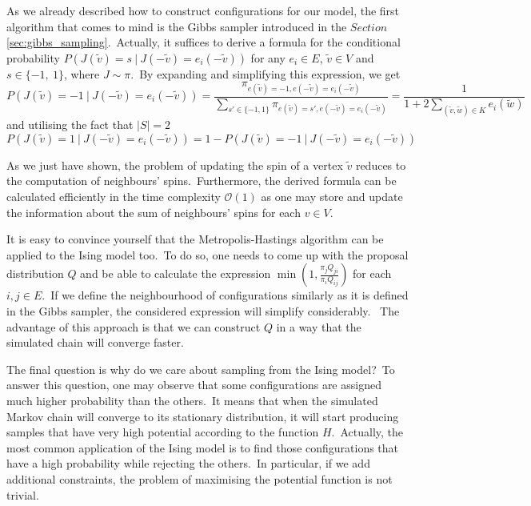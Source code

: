 \documentclass[shortabstract, english, lic]{iithesis}
\theoremstyle{default_theorem_style}\newtheorem{theorem}{Theorem}
\theoremstyle{default_theorem_style}\newtheorem{definition}{Definition}
\begin{document}
\noindent As we already described how to construct configurations for our model, the first algorithm that comes to mind
is the Gibbs sampler introduced in the $Section$ \ref{sec:gibbs_sampling}.\ Actually, it suffices to derive a formula
for the conditional probability $P(J(\tilde{v}) = s\ |\ J(-\tilde{v})=e_i(-\tilde{v}))$ for any $e_i \in E$,
$\tilde{v} \in V$ and $s \in \{-1,\ 1\}$, where $J \sim \pi$.\ By expanding and simplifying this expression, we get
$$
P(J(\tilde{v}) = -1\ |\ J(-\tilde{v})=e_i(-\tilde{v})) =
\frac{\pi_{e(\tilde{v}) =
-1,e(-\tilde{v}) = e_i(-\tilde{v})}}
{\sum\limits_{s' \in \{-1, 1\}} \pi_{e(\tilde{v}) = s', e(-\tilde{v}) = e_i(-\tilde{v})}} =
\frac{1}{1 + 2 \sum\limits_{(\tilde{v}, \tilde{w}) \in K} e_i(\tilde{w})}
$$
and utilising the fact that $|S| = 2$
$$
P(J(\tilde{v}) = 1\ |\ J(-\tilde{v})=e_i(-\tilde{v})) = 1 - P(J(\tilde{v}) = -1\ |\ J(-\tilde{v})=e_i(-\tilde{v}))
$$

\noindent As we just have shown, the problem of updating the spin of a vertex $\tilde{v}$ reduces to the computation of
neighbours' spins.\ Furthermore, the derived formula can be calculated efficiently in the time
complexity $\mathcal{O}(1)$ as one may store and update the information about the sum of neighbours'
spins for each $v \in V$.\newline

\noindent It is easy to convince yourself that the Metropolis-Hastings algorithm can be applied to the Ising model
too.\ To do so, one needs to come up with the proposal distribution $Q$ and be able to calculate the expression
$\min{(1, \frac{\pi_j Q_{ji}}{\pi_i Q_{ij}})}$ for each $i, j \in E$.\ If we define the neighbourhood of configurations
similarly as it is defined in the Gibbs sampler, the considered expression will simplify considerably. \ The
advantage of this approach is that we can construct $Q$ in a way that the simulated chain will converge faster.\newline

\noindent The final question is why do we care about sampling from the Ising model?\ To answer this question, one may
observe that some configurations are assigned much higher probability than the others.\ It means that when the simulated
Markov chain will converge to its stationary distribution, it will start producing samples that have very high
potential according to the function $H$.\ Actually, the most common application of the Ising model is to find
those configurations that have a high probability while rejecting the others.\ In particular, if we add
additional constraints, the problem of maximising the potential function is not trivial.
\end{document}
